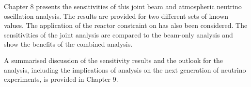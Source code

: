 Chapter 8 presents the sensitivities of this joint beam and atmospheric neutrino oscillation analysis.
The results are provided for two different sets of known values. The application of the reactor constraint on  has also been considered. The sensitivities of the joint analysis are compared to the beam-only analysis and show the benefits of the combined analysis.

A summarised discussion of the sensitivity results and the outlook for the analysis, including the implications of analysis on the next generation of neutrino experiments, is provided in Chapter 9.

